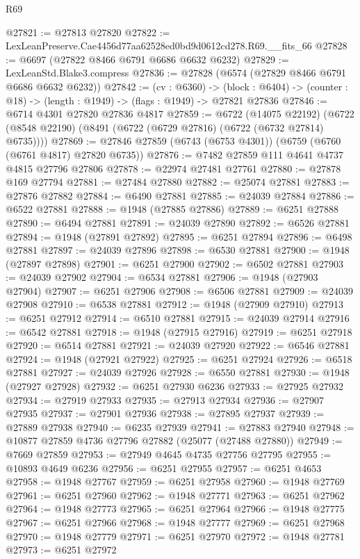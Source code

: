 \begin{lexlean}{R69}
\begin{coremodule}
{@27821 := @27813 @27820
@27822 := LexLeanPreserve.Cae4456d77aa62528ed0bd9d0612cd278.R69.__fits_66
@27828 := @6697 (@27822 @8466 @6791 @6686 @6632 @6232)
@27829 := LexLeanStd.Blake3.compress
@27836 := @27828 (@6574 (@27829 @8466 @6791 @6686 @6632 @6232))
@27842 := (cv : @6360) ->
  (block : @6404) -> (counter : @18) -> (length : @1949) -> (flags : @1949) -> @27821 @27836
@27846 := @6714 @4301 @27820 @27836 @4817
@27859 := @6722
    (@14075 @22192)
    (@6722 (@8548 @22190) (@8491 (@6722 (@6729 @27816) (@6722 (@6732 @27814) @6735))))
@27869 := @27846 @27859 (@6743 (@6753 @4301)) (@6759 (@6760 (@6761 @4817) @27820 @6735))
@27876 := @7482 @27859 @111 @4641 @4737 @4815 @27796 @27806
@27878 := @22974 @27481 @27761
@27880 := @27878 @169 @27794
@27881 := @27484 @27880
@27882 := @25074 @27881
@27883 := @27876 @27882
@27884 := @6490 @27881
@27885 := @24039 @27884
@27886 := @6522 @27881
@27888 := @1948 (@27885 @27886)
@27889 := @6251 @27888
@27890 := @6494 @27881
@27891 := @24039 @27890
@27892 := @6526 @27881
@27894 := @1948 (@27891 @27892)
@27895 := @6251 @27894
@27896 := @6498 @27881
@27897 := @24039 @27896
@27898 := @6530 @27881
@27900 := @1948 (@27897 @27898)
@27901 := @6251 @27900
@27902 := @6502 @27881
@27903 := @24039 @27902
@27904 := @6534 @27881
@27906 := @1948 (@27903 @27904)
@27907 := @6251 @27906
@27908 := @6506 @27881
@27909 := @24039 @27908
@27910 := @6538 @27881
@27912 := @1948 (@27909 @27910)
@27913 := @6251 @27912
@27914 := @6510 @27881
@27915 := @24039 @27914
@27916 := @6542 @27881
@27918 := @1948 (@27915 @27916)
@27919 := @6251 @27918
@27920 := @6514 @27881
@27921 := @24039 @27920
@27922 := @6546 @27881
@27924 := @1948 (@27921 @27922)
@27925 := @6251 @27924
@27926 := @6518 @27881
@27927 := @24039 @27926
@27928 := @6550 @27881
@27930 := @1948 (@27927 @27928)
@27932 := @6251 @27930 @6236
@27933 := @27925 @27932
@27934 := @27919 @27933
@27935 := @27913 @27934
@27936 := @27907 @27935
@27937 := @27901 @27936
@27938 := @27895 @27937
@27939 := @27889 @27938
@27940 := @6235 @27939
@27941 := @27883 @27940
@27948 := @10877 @27859 @4736 @27796 @27882 (@25077 (@27488 @27880))
@27949 := @7669 @27859
@27953 := @27949 @4645 @4735 @27756 @27795
@27955 := @10893 @4649 @6236
@27956 := @6251 @27955
@27957 := @6251 @4653
@27958 := @1948 @27767
@27959 := @6251 @27958
@27960 := @1948 @27769
@27961 := @6251 @27960
@27962 := @1948 @27771
@27963 := @6251 @27962
@27964 := @1948 @27773
@27965 := @6251 @27964
@27966 := @1948 @27775
@27967 := @6251 @27966
@27968 := @1948 @27777
@27969 := @6251 @27968
@27970 := @1948 @27779
@27971 := @6251 @27970
@27972 := @1948 @27781
@27973 := @6251 @27972
}
\end{coremodule}
\end{lexlean}
